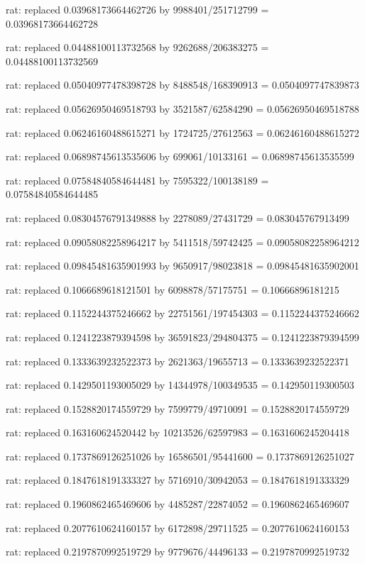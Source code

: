 \documentclass[a4paper,10pt]{article}
\begin{document}
\begin{eulernotebook}
\begin{eulercomment}
\begin{eulercomment}
\begin{eulercomment}
\begin{eulercomment}
\begin{eulercomment}
\begin{eulercomment}
\begin{eulercomment}
\begin{eulercomment}
\begin{eulercomment}
\begin{eulercomment}
\begin{eulercomment}
\begin{eulercomment}
\begin{eulercomment}
\begin{eulercomment}
\begin{eulercomment}
\begin{eulercomment}
\begin{euleroutput}
  rat: replaced 0.03968173664462726 by 9988401/251712799 = 0.03968173664462728
  
  rat: replaced 0.04488100113732568 by 9262688/206383275 = 0.04488100113732569
  
  rat: replaced 0.05040977478398728 by 8488548/168390913 = 0.0504097747839873
  
  rat: replaced 0.05626950469518793 by 3521587/62584290 = 0.05626950469518788
  
  rat: replaced 0.06246160488615271 by 1724725/27612563 = 0.06246160488615272
  
  rat: replaced 0.06898745613535606 by 699061/10133161 = 0.06898745613535599
  
  rat: replaced 0.07584840584644481 by 7595322/100138189 = 0.07584840584644485
  
  rat: replaced 0.08304576791349888 by 2278089/27431729 = 0.083045767913499
  
  rat: replaced 0.09058082258964217 by 5411518/59742425 = 0.09058082258964212
  
  rat: replaced 0.09845481635901993 by 9650917/98023818 = 0.09845481635902001
  
  rat: replaced 0.1066689618121501 by 6098878/57175751 = 0.10666896181215
  
  rat: replaced 0.1152244375246662 by 22751561/197454303 = 0.1152244375246662
  
  rat: replaced 0.1241223879394598 by 36591823/294804375 = 0.1241223879394599
  
  rat: replaced 0.1333639232522373 by 2621363/19655713 = 0.1333639232522371
  
  rat: replaced 0.1429501193005029 by 14344978/100349535 = 0.142950119300503
  
  rat: replaced 0.1528820174559729 by 7599779/49710091 = 0.1528820174559729
  
  rat: replaced 0.163160624520442 by 10213526/62597983 = 0.1631606245204418
  
  rat: replaced 0.1737869126251026 by 16586501/95441600 = 0.1737869126251027
  
  rat: replaced 0.1847618191333327 by 5716910/30942053 = 0.1847618191333329
  
  rat: replaced 0.1960862465469606 by 4485287/22874052 = 0.1960862465469607
  
  rat: replaced 0.2077610624160157 by 6172898/29711525 = 0.2077610624160153
  
  rat: replaced 0.2197870992519729 by 9779676/44496133 = 0.2197870992519732
  

\end{euleroutput}
\end{eulercomment}
\end{eulercomment}
\end{eulercomment}
\end{eulercomment}
\end{eulercomment}
\end{eulercomment}
\end{eulercomment}
\end{eulercomment}
\end{eulercomment}
\end{eulercomment}
\end{eulercomment}
\end{eulercomment}
\end{eulercomment}
\end{eulercomment}
\end{eulercomment}
\end{eulercomment}
\end{eulernotebook}
\end{document}
